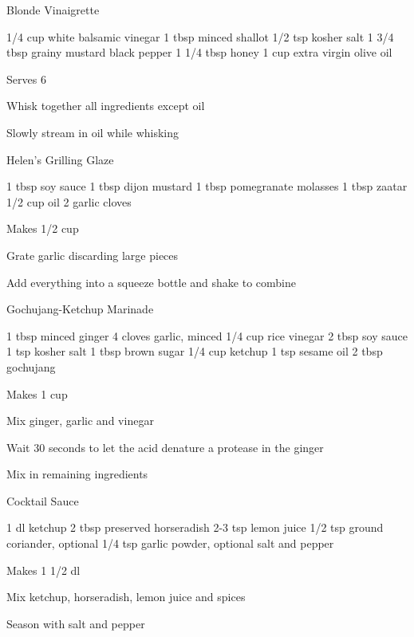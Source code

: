 \begin{recipe}{Blonde Vinaigrette}{\vegetarian{}}
\begin{ingredients}
1/4 cup white balsamic vinegar
1 tbsp minced shallot
1/2 tsp kosher salt
1 3/4 tbsp grainy mustard
black pepper
1 1/4 tbsp honey
1 cup extra virgin olive oil
\end{ingredients}
\nextcolumn
Serves 6
\begin{steps}
\item Whisk together all ingredients except oil
\item Slowly stream in oil while whisking
\end{steps}
\end{recipe}

\begin{recipe}{Helen's Grilling Glaze}{\vegetarian{}}
\begin{ingredients}
1 tbsp soy sauce
1 tbsp dijon mustard
1 tbsp pomegranate molasses
1 tbsp zaatar
1/2 cup oil
2 garlic cloves
\end{ingredients}
\nextcolumn
Makes 1/2 cup
\begin{steps}
    \item Grate garlic discarding large pieces
    \item Add everything into a squeeze bottle and shake to combine
\end{steps}
\end{recipe}

\begin{recipe}{Gochujang-Ketchup Marinade}{\vegetarian{}}
\begin{ingredients}
1 tbsp minced ginger
4 cloves garlic, minced
1/4 cup rice vinegar
2 tbsp soy sauce
1 tsp kosher salt
1 tbsp brown sugar
1/4 cup ketchup
1 tsp sesame oil
2 tbsp gochujang
\end{ingredients}
\nextcolumn
Makes 1 cup
\begin{steps}
    \item Mix ginger, garlic and vinegar
    \item Wait 30 seconds to let the acid denature a protease in the ginger
    \item Mix in remaining ingredients
\end{steps}
\end{recipe}

\begin{recipe}{Cocktail Sauce}{\preheat{}\totaltime{}}
\begin{ingredients}
1 dl ketchup
2 tbsp preserved horseradish
2-3 tsp lemon juice
1/2 tsp ground coriander, optional
1/4 tsp garlic powder, optional
salt and pepper
\end{ingredients}
\nextcolumn
Makes 1 1/2 dl
\begin{steps}
    \item Mix ketchup, horseradish, lemon juice and spices
    \item Season with salt and pepper
\end{steps}
\end{recipe}
